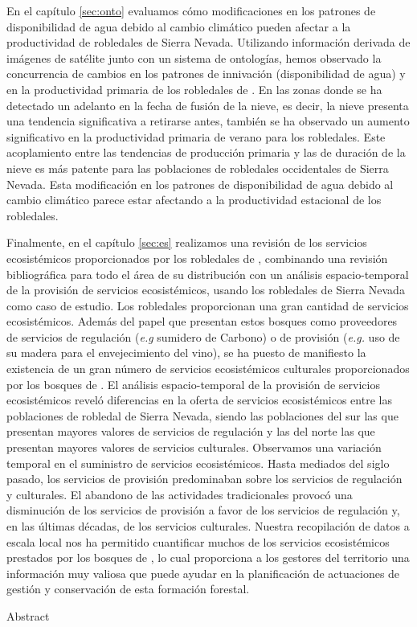 En el capítulo \ref{sec:onto} evaluamos cómo modificaciones en los patrones de disponibilidad de agua debido al cambio climático pueden afectar a la productividad de robledales de Sierra Nevada. Utilizando información derivada de imágenes de satélite junto con un sistema de ontologías, hemos observado la concurrencia de cambios en los patrones de innivación (disponibilidad de agua) y en la productividad primaria de los robledales de \Qp. En las zonas donde se ha detectado un adelanto en la fecha de fusión de la nieve, es decir, la nieve presenta una tendencia significativa a retirarse antes, también se ha observado un aumento significativo en la productividad primaria de verano para los robledales. Este acoplamiento entre las tendencias de producción primaria y las de duración de la nieve es más patente para las poblaciones de robledales occidentales de Sierra Nevada. Esta modificación en los patrones de disponibilidad de agua debido al cambio climático parece estar afectando a la productividad estacional de los robledales. 

Finalmente, en el capítulo \ref{sec:es} realizamos una revisión de los servicios ecosistémicos proporcionados por los robledales de \Qp, combinando una revisión bibliográfica para todo el área de su distribución con un análisis espacio-temporal de la provisión de servicios ecosistémicos, usando los robledales de Sierra Nevada como caso de estudio. Los robledales proporcionan una gran cantidad de servicios ecosistémicos. Además del papel que presentan estos bosques como proveedores de servicios de regulación (\emph{e.g} sumidero de Carbono) o de provisión (\emph{e.g.} uso de su madera para el envejecimiento del vino), se ha puesto de manifiesto la existencia de un gran número de servicios ecosistémicos culturales proporcionados por los bosques de \Qp. El análisis espacio-temporal de la provisión de servicios ecosistémicos reveló diferencias en la oferta de servicios ecosistémicos entre las poblaciones de robledal de Sierra Nevada, siendo las poblaciones del sur las que presentan mayores valores de servicios de regulación y las del norte las que presentan mayores valores de servicios culturales. Observamos una variación temporal en el suministro de servicios ecosistémicos. Hasta mediados del siglo pasado, los servicios de provisión predominaban sobre los servicios de regulación y culturales. El abandono de las actividades tradicionales provocó una disminución de los servicios de provisión a favor de los servicios de regulación y, en las últimas décadas, de los servicios culturales. Nuestra recopilación de datos a escala local nos ha permitido cuantificar muchos de los servicios ecosistémicos prestados por los bosques de \Qp, lo cual proporciona a los gestores del territorio una información muy valiosa que puede ayudar en la planificación de actuaciones de gestión y conservación de esta formación forestal. 

\vspace*{20mm}

{Abstract}
\label{sec:abstract_es}


